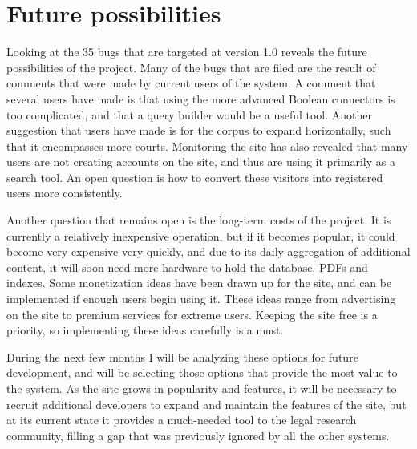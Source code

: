 \label{future}
\section{Future possibilities}
Looking at the 35 bugs that are targeted at version 1.0 reveals the future possibilities of the project. Many of the bugs that are filed are the result of comments that were made by current users of the system. A comment that several users have made is that using the more advanced Boolean connectors is too complicated, and that a query builder would be a useful tool. Another suggestion that users have made is for the corpus to expand horizontally, such that it encompasses more courts. Monitoring the site has also revealed that many users are not creating accounts on the site, and thus are using it primarily as a search tool. An open question is how to convert these visitors into registered users more consistently. 

Another question that remains open is the long-term costs of the project. It is currently a relatively inexpensive operation, but if it becomes popular, it could become very expensive very quickly, and due to its daily aggregation of additional content, it will soon need more hardware to hold the database, PDFs and indexes. Some monetization ideas have been drawn up for the site, and can be implemented if enough users begin using it. These ideas range from advertising on the site to premium services for extreme users. Keeping the site free is a priority, so implementing these ideas carefully is a must.

During the next few months I will be analyzing these options for future development, and will be selecting those options that provide the most value to the system. As the site grows in popularity and features, it will be necessary to recruit additional developers to expand and maintain the features of the site, but at its current state it provides a much-needed tool to the legal research community, filling a gap that was previously ignored by all the other systems.
